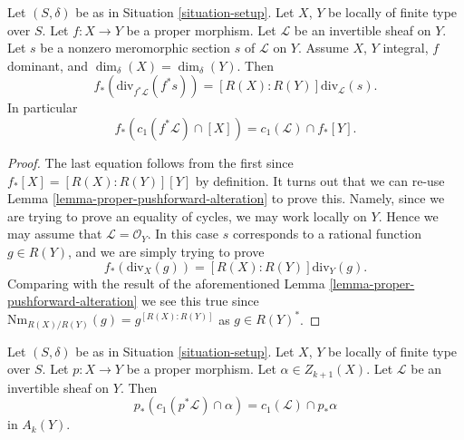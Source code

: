 \begin{lemma}
\label{lemma-equal-c1-as-cycles}
Let $(S, \delta)$ be as in Situation \ref{situation-setup}.
Let $X$, $Y$ be locally of finite type over $S$.
Let $f : X \to Y$ be a proper morphism.
Let $\mathcal{L}$ be an invertible sheaf on $Y$.
Let $s$ be a nonzero meromorphic section $s$ of $\mathcal{L}$ on $Y$.
Assume $X$, $Y$ integral, $f$ dominant, and $\dim_\delta(X) = \dim_\delta(Y)$.
Then
$$
f_*\left(\text{div}_{f^*\mathcal{L}}(f^*s)\right) =
[R(X) : R(Y)]\text{div}_\mathcal{L}(s).
$$
In particular
$$
f_*(c_1(f^*\mathcal{L}) \cap [X]) = c_1(\mathcal{L}) \cap f_*[Y].
$$
\end{lemma}

\begin{proof}
The last equation follows from the first since $f_*[X] = [R(X) : R(Y)][Y]$
by definition. It turns out that we can re-use
Lemma \ref{lemma-proper-pushforward-alteration}
to prove this. Namely, since we are trying to prove an equality
of cycles, we may work locally on $Y$. Hence we may assume
that $\mathcal{L} = \mathcal{O}_Y$. In this case $s$
corresponds to a rational function $g \in R(Y)$, and
we are simply trying to prove
$$
f_*\left(\text{div}_X(g)\right) =
[R(X) : R(Y)]\text{div}_Y(g).
$$
Comparing with the result of the aforementioned
Lemma \ref{lemma-proper-pushforward-alteration}
we see this true since
$\text{Nm}_{R(X)/R(Y)}(g) = g^{[R(X) : R(Y)]}$
as $g \in R(Y)^*$.
\end{proof}

\begin{lemma}
\label{lemma-pushforward-cap-c1}
Let $(S, \delta)$ be as in Situation \ref{situation-setup}.
Let $X$, $Y$ be locally of finite type over $S$.
Let $p : X \to Y$ be a proper morphism.
Let $\alpha \in Z_{k + 1}(X)$.
Let $\mathcal{L}$ be an invertible sheaf on $Y$.
Then
$$
p_*(c_1(p^*\mathcal{L}) \cap \alpha) = c_1(\mathcal{L}) \cap p_*\alpha
$$
in $A_k(Y)$.
\end{lemma}

